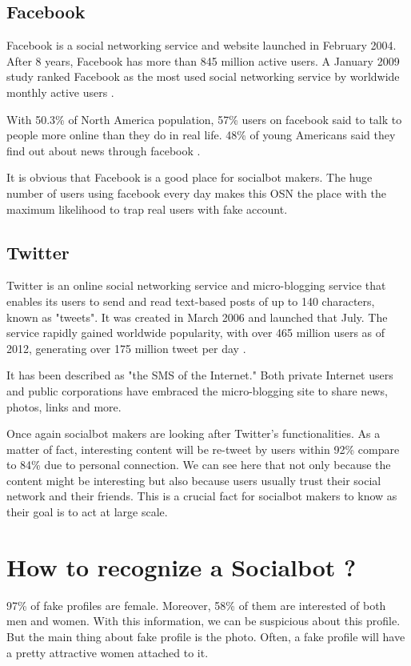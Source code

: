 \documentclass[12pt,a4paper]{article}
\begin{document}
  \subsection{Facebook}
  Facebook is a social networking service and website launched in February 2004. After 8 years,
  Facebook has more than 845 million active users. A January 2009 study ranked Facebook as the
  most used social networking service by worldwide monthly active users
  \cite{wikipedia_facebook}.

  With 50.3\% of North America population, 57\% users on facebook said to talk to people more
  online than they do in real life. 48\% of young Americans said they find out about news
  through facebook \cite{facebook_takes_over_top_spot_twitter_climbs}.

  It is obvious that Facebook is a good place for socialbot makers. The huge number of users
  using facebook every day makes this OSN the place with the maximum likelihood to trap real
  users with fake account.

  \subsection{Twitter}
  Twitter is an online social networking service and micro-blogging service that enables its
  users to send and read text-based posts of up to 140 characters, known as "tweets".
  It was created in March 2006 and launched that July. The service rapidly gained worldwide
  popularity, with over 465 million users as of 2012, generating over 175 million tweet per day
  \cite{wikipedia_twitter}.

  It has been described as "the SMS of the Internet." Both private Internet users and public
  corporations have embraced the micro-blogging site to share news, photos, links and more.

  Once again socialbot makers are looking after Twitter's functionalities. As a matter of fact,
  interesting content will be re-tweet by users within 92\% compare to 84\% due to personal
  connection. We can see here that not only because the content might be interesting but also
  because users usually trust their social network and their friends. This is a crucial fact
  for socialbot makers to know as their goal is to act at large scale.

  \section{How to recognize a Socialbot ?}
  97\% of fake profiles are female. Moreover, 58\% of them are interested of both men and women.
  With this information, we can be suspicious about this profile. But the main thing about fake
  profile is the photo. Often, a fake profile will have a pretty attractive women attached to it.
\end{document}
